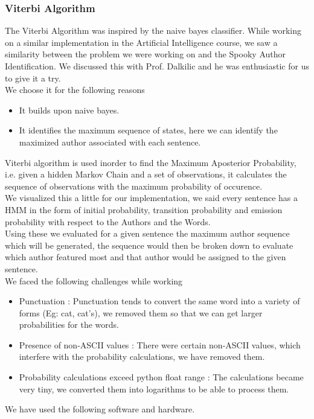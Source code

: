 \documentclass[fleqn,10pt]{SelfArx} %
\begin{document}
\subsubsection{Viterbi Algorithm}
The Viterbi Algorithm was inspired by the naive bayes classifier. While working on a similar implementation in the Artificial Intelligence course, we saw a similarity between the problem we were working on and the Spooky Author Identification. We discussed this with Prof. Dalkilic and he was enthusiastic for us to give it a try.\\
We choose it for the following reasons
\begin{itemize}[noitemsep]
	\item It builds upon naive bayes.
	\item It identifies the maximum sequence of states, here we can identify the maximized author associated with each sentence.
\end{itemize}
Viterbi algorithm is used inorder to find the Maximum Aposterior Probability, i.e. given a hidden Markov Chain and a set of observations, it calculates the sequence of observations with the maximum probability of occurence.\\
We visualized this a little for our implementation, we said every sentence has a HMM in the form of initial probability, transition probability and emission probability with respect to the Authors and the Words.\\
Using these we evaluated for a given sentence the maximum author sequence which will be generated, the sequence would then be broken down to evaluate which author featured most and that author would be assigned to the given sentence.\\
We faced the following challenges while working
\begin{itemize}[noitemsep]
	\item Punctuation : Punctuation tends to convert the same word into a variety of forms (Eg: cat, cat's), we removed them so that we can get larger probabilities for the words.
	\item Presence of non-ASCII values : There were certain non-ASCII values, which interfere with the probability calculations, we have removed them.
	\item Probability calculations exceed python float range : The calculations became very tiny, we converted them into logarithms to be able to process them.
\end{itemize}
We have used the following software and hardware.\\
\end{document}
